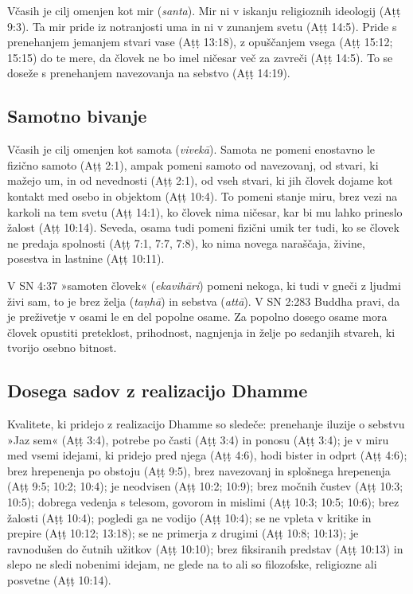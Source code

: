 Včasih je cilj omenjen kot mir
(\emph{santa}). Mir ni v iskanju religioznih ideologij (Aṭṭ 9:3). Ta mir
pride iz notranjosti uma in ni v zunanjem svetu (Aṭṭ 14:5). Pride s
prenehanjem jemanjem stvari vase (Aṭṭ 13:18), z opuščanjem vsega (Aṭṭ
15:12; 15:15) do te mere, da človek ne bo imel ničesar več za zavreči
(Aṭṭ 14:5). To se doseže s prenehanjem navezovanja na sebstvo (Aṭṭ
14:19).

\subsection{Samotno bivanje}

Včasih je cilj omenjen kot samota
(\emph{vivekā}). Samota ne pomeni enostavno le fizično samoto (Aṭṭ 2:1),
ampak pomeni samoto od navezovanj, od stvari, ki mažejo um, in od
nevednosti (Aṭṭ 2:1), od vseh stvari, ki jih človek dojame kot kontakt
med osebo in objektom (Aṭṭ 10:4). To pomeni stanje miru, brez vezi na
karkoli na tem svetu (Aṭṭ 14:1), ko človek nima ničesar, kar bi mu lahko
prineslo žalost (Aṭṭ 10:14). Seveda, osama tudi pomeni fizični umik ter
tudi, ko se človek ne predaja spolnosti (Aṭṭ 7:1, 7:7, 7:8), ko nima
novega naraščaja, živine, posestva in lastnine (Aṭṭ 10:11).

V SN 4:37 »samoten človek« (\emph{ekavihāri}) pomeni nekoga, ki tudi v
gneči z ljudmi živi sam, to je brez želja (\emph{taṇhā}) in sebstva
(\emph{attā}). V SN 2:283 Buddha pravi, da je preživetje v osami le en
del popolne osame. Za popolno dosego osame mora človek opustiti 
preteklost, prihodnost, nagnjenja in želje po sedanjih stvareh, ki
tvorijo osebno bitnost.

\subsection{Dosega sadov z realizacijo Dhamme}

Kvalitete, ki pridejo
z realizacijo Dhamme so sledeče: prenehanje iluzije o sebstvu »Jaz sem«
(Aṭṭ 3:4), potrebe po časti (Aṭṭ 3:4) in ponosu (Aṭṭ 3:4); je v miru med
vsemi idejami, ki pridejo pred njega (Aṭṭ 4:6), hodi bister in odprt
(Aṭṭ 4:6); brez hrepenenja po obstoju (Aṭṭ 9:5), brez navezovanj in
splošnega hrepenenja (Aṭṭ 9:5; 10:2; 10:4); je neodvisen (Aṭṭ 10:2;
10:9); brez močnih čustev (Aṭṭ 10:3; 10:5); dobrega vedenja s telesom,
govorom in mislimi (Aṭṭ 10:3; 10:5; 10:6); brez žalosti (Aṭṭ 10:4);
pogledi ga ne vodijo (Aṭṭ 10:4); se ne vpleta v kritike in prepire (Aṭṭ
10:12; 13:18); se ne primerja z drugimi (Aṭṭ 10:8; 10:13); je ravnodušen
do čutnih užitkov (Aṭṭ 10:10); brez fiksiranih predstav (Aṭṭ 10:13) in
slepo ne sledi nobenimi idejam, ne glede na to ali so filozofske,
religiozne ali posvetne (Aṭṭ 10:14).

